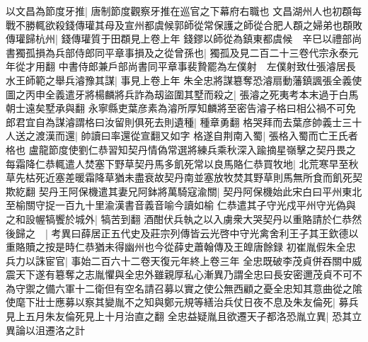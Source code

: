 以文昌為節度牙推|{
	唐制節度觀察牙推在巡官之下幕府右職也}
文昌湖州人也初頵每戰不勝輒欲殺錢傳瓘其母及宣州都虞候郭師從常保護之師從合肥人頵之婦弟也頵敗傳瓘歸杭州|{
	錢傳瓘質于田頵見上卷上年}
錢鏐以師從為鎮東都虞候　辛巳以禮部尚書獨孤損為兵部侍郎同平章事損及之從曾孫也|{
	獨孤及見二百二十三卷代宗永泰元年從才用翻}
中書侍郎兼戶部尚書同平章事裴贄罷為左僕射　左僕射致仕張濬居長水王師範之舉兵濬豫其謀|{
	事見上卷上年}
朱全忠將謀簒奪恐濬扇動藩鎮諷張全義使圖之丙申全義遣牙將楊麟將兵詐為刼盜圍其墅而殺之|{
	張濬之死夷考本末過于白馬朝士遠矣墅承與翻}
永寧縣吏葉彦素為濬所厚知麟將至密告濬子格曰相公禍不可免郎君宜自為謀濬謂格曰汝留則俱死去則遺種|{
	種章勇翻}
格哭拜而去葉彦帥義士三十人送之渡漢而還|{
	帥讀曰率還從宣翻又如字}
格遂自荆南入蜀|{
	張格入蜀而亡王氏者格也}
盧龍節度使劉仁恭習知契丹情偽常選將練兵乘秋深入踰摘星嶺擊之契丹畏之每霜降仁恭輒遣人焚塞下野草契丹馬多飢死常以良馬賂仁恭買牧地|{
	北荒寒早至秋草先枯死近塞差暖霜降草猶未盡衰故契丹南並塞放牧焚其野草則馬無所食而飢死契欺紇翻}
契丹王阿保機遣其妻兄阿鉢將萬騎寇渝關|{
	契丹阿保機始此宋白曰平州東北至榆關守捉一百九十里渝漢書音義音喻今讀如榆}
仁恭遣其子守光戍平州守光偽與之和設幄犒饗於城外|{
	犒苦到翻}
酒酣伏兵執之以入虜衆大哭契丹以重賂請於仁恭然後歸之　|{
	考異曰薛居正五代史及莊宗列傳皆云光啓中守光禽舍利王子其王欽德以重賂贖之按是時仁恭猶未得幽州也今從薛史蕭翰傳及王皥唐餘録}
初崔胤假朱全忠兵力以誅宦官|{
	事始二百六十二卷天復元年終上卷三年}
全忠既破李茂貞併吞關中威震天下遂有簒奪之志胤懼與全忠外雖親厚私心漸異乃謂全忠曰長安密邇茂貞不可不為守禦之備六軍十二衛但有空名請召募以實之使公無西顧之憂全忠知其意曲從之隂使麾下壯士應募以察其變胤不之知與鄭元規等繕治兵仗日夜不息及朱友倫死|{
	募兵見上五月朱友倫死見上十月治直之翻}
全忠益疑胤且欲遷天子都洛恐胤立異|{
	恐其立異論以沮遷洛之計}


